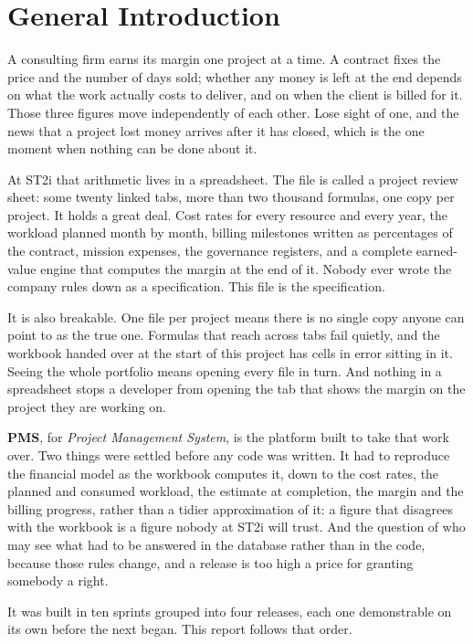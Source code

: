 \chapter*{General Introduction}

A consulting firm earns its margin one project at a time. A contract fixes the price and the
number of days sold; whether any money is left at the end depends on what the work actually costs
to deliver, and on when the client is billed for it. Those three figures move independently of
each other. Lose sight of one, and the news that a project lost money arrives after it has closed,
which is the one moment when nothing can be done about it.

At ST2i that arithmetic lives in a spreadsheet. The file is called a project review sheet: some
twenty linked tabs, more than two thousand formulas, one copy per project. It holds a great deal.
Cost rates for every resource and every year, the workload planned month by month, billing
milestones written as percentages of the contract, mission expenses, the governance registers, and
a complete earned-value engine that computes the margin at the end of it. Nobody ever wrote the
company rules down as a specification. This file is the specification.

It is also breakable. One file per project means there is no single copy anyone can point to as
the true one. Formulas that reach across tabs fail quietly, and the workbook handed over at the
start of this project has cells in error sitting in it. Seeing the whole portfolio means opening
every file in turn. And nothing in a spreadsheet stops a developer from opening the tab that shows
the margin on the project they are working on.

\textbf{PMS}, for \textit{Project Management System}, is the platform built to take that work
over. Two things were settled before any code was written. It had to reproduce the financial model
as the workbook computes it, down to the cost rates, the planned and consumed workload, the
estimate at completion, the margin and the billing progress, rather than a tidier approximation of
it: a figure that disagrees with the workbook is a figure nobody at ST2i will trust. And the
question of who may see what had to be answered in the database rather than in the code, because
those rules change, and a release is too high a price for granting somebody a right.

It was built in ten sprints grouped into four releases, each one demonstrable on its own before
the next began. This report follows that order.

